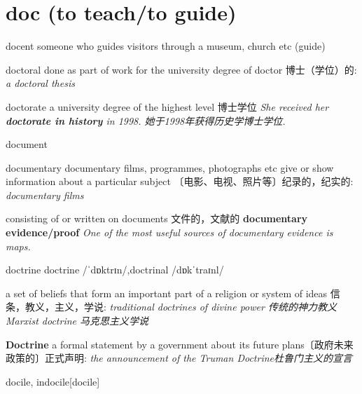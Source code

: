 \section{doc (to teach/to guide)}

\begin{DefWord}{docent}
    someone who guides visitors through a museum, church etc (guide)
\end{DefWord}

\begin{DefWord}{doctoral}
    done as part of work for the university degree of doctor
    博士（学位）的:
    \textit{a doctoral thesis}
\end{DefWord}

\begin{DefWord}{doctorate}
    a university degree of the highest level 博士学位
    \textit{She received her \textbf{doctorate in history} in 1998. 她于1998年获得历史学博士学位. }
\end{DefWord}


\begin{DefWord}{document}
\end{DefWord}

\begin{DefWord}{documentary}
    documentary films, programmes, photographs etc give or show information about a particular subject
    〔电影、电视、照片等〕纪录的，纪实的:
    \textit{documentary films}

    consisting of or written on documents
    文件的，文献的
    \textbf{documentary evidence/proof}
    \textit{One of the most useful sources of documentary evidence is maps.}
\end{DefWord}

\begin{DefWord}{doctrine}
    doctrine /ˈdɒktrɪn/,doctrinal /dɒkˈtraɪnl/

    a set of beliefs that form an important part of a religion or system of ideas
    信条，教义，主义，学说:
    \textit{traditional doctrines of divine power 传统的神力教义}
    \textit{Marxist doctrine 马克思主义学说}

    \textbf{Doctrine}  a formal statement by a government about its future plans〔政府未来政策的〕正式声明:
    \textit{the announcement of the Truman Doctrine杜鲁门主义的宣言}
\end{DefWord}

\begin{DefWord}{docile, indocile}[docile]
\end{DefWord}